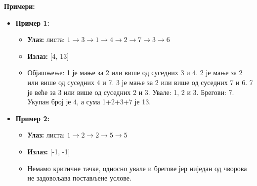 \textbf{Примери:}
\begin{itemize}
    \item \textbf{Пример 1:}
    \begin{itemize}
        \item \textbf{Улаз:} листа: $1 \rightarrow 3 \rightarrow 1 \rightarrow 4 \rightarrow 2 \rightarrow 7 \rightarrow 3 \rightarrow 6$
        \item \textbf{Излаз:} [4, 13]
        \item Објашњење: 1 је мање за 2 или више од суседних 3 и 4. 2 је мање за 2 или више од суседних 4 и 7. 3 је мање за 2 или више од суседних 7 и 6. 7 је веће за 3 или више од суседних 2 и 3. Увале: 1, 2 и 3. Брегови: 7. Укупан број је 4, а сума 1+2+3+7 је 13.
    \end{itemize}
    \item \textbf{Пример 2:}
    \begin{itemize}
        \item \textbf{Улаз:} листа: $1 \rightarrow 2 \rightarrow 2 \rightarrow 5 \rightarrow 5$
        \item \textbf{Излаз:} [-1, -1]
        \item Немамо критичне тачке, односно увале и брегове јер ниједан од чворова не задовољава постављене услове.
    \end{itemize}
\end{itemize}

